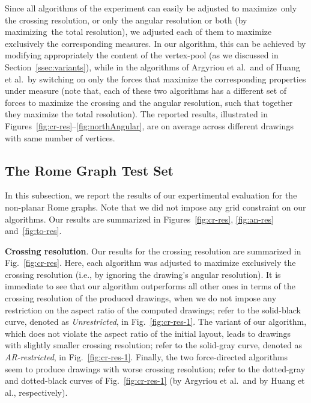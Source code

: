 \documentclass{comjnl}
\newcommand{\myparagraph}[1]{\medskip\noindent\textbf{#1}.}
\begin{document}
Since all algorithms of the experiment can easily be adjusted to maximize~only the crossing resolution, or only the angular resolution or both (by maximizing~the total resolution), we adjusted each of them to maximize exclusively the corresponding measures. In our algorithm, this can be achieved by modifying appropriately the content of the vertex-pool (as we discussed in Section~\ref{ssec:variants}), while in the algorithms of Argyriou et al.\ and of Huang et al.\ by switching on only the forces that maximize the corresponding properties under measure (note that, each of these two algorithms has a different set of forces to maximize the crossing and the angular resolution, such that together they maximize the total resolution). The reported results, illustrated in Figures~\ref{fig:cr-res}--\ref{fig:northAngular}, are on average across different drawings with same number of vertices.

\subsection{The Rome Graph Test Set}
\label{ssec:rome}

In this subsection, we report the results of our expertimental evaluation for the non-planar Rome graphs. Note that we did not impose any grid constraint on our algorithms. Our results are summarized in Figures~\ref{fig:cr-res}, \ref{fig:an-res} and~\ref{fig:to-res}.

\myparagraph{Crossing resolution} Our results for the crossing resolution are summarized in Fig.~\ref{fig:cr-res}. Here, each algorithm was adjusted to maximize exclusively the crossing resolution (i.e., by ignoring the drawing's angular resolution). It is immediate to see that our algorithm outperforms all other ones in terms of the crossing resolution of the produced drawings, when we do not impose any restriction on the aspect ratio of the computed drawings; refer to the solid-black curve, denoted as \emph{Unrestricted}, in Fig.~\ref{fig:cr-res-1}. The variant of our algorithm, which does not violate the aspect ratio of the initial layout, leads to drawings with slightly smaller crossing resolution; refer to the solid-gray curve, denoted as \emph{AR-restricted}, in Fig.~\ref{fig:cr-res-1}. Finally, the two force-directed algorithms seem to produce drawings with worse crossing resolution; refer to the dotted-gray and dotted-black curves of Fig.~\ref{fig:cr-res-1} (by Argyriou et al.\ and by Huang et al., respectively).
\end{document}
